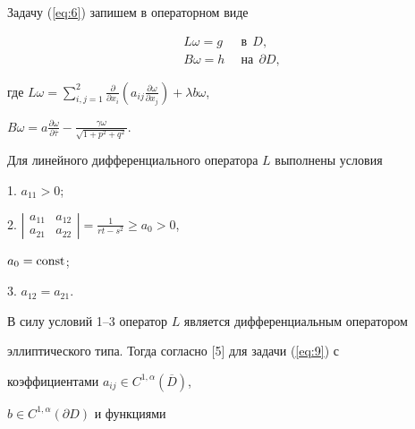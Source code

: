 \begin{pf}


Задачу (\ref{eq:6}) запишем в операторном виде


\begin{equation}


\label{eq:9}


\begin{split}


L\omega=g & \ \; \text{в}\ \ D, \\


B\omega=h & \ \; \text{на}\ \ \partial D,


\end{split}


\end{equation}


где $L\omega=\sum\limits^2_{i,j=1} {\frac{\partial }{\partial x_i }


({a_{ij} \frac{\partial \omega }{\partial x_j }})}+\lambda b\omega$,


$B\omega=a\frac{\partial \omega }{\partial \overline \tau } -


\frac{\gamma \omega }{\sqrt {1+p^2+q^2} }$.





Для линейного дифференциального оператора $L$ выполнены условия





1. $a_{11} > 0$;





2. $\left|\begin{smallmatrix} a_{11} & a_{12} \\ a_{21} & a_{22}


\end{smallmatrix} \right|=\frac{1}{rt - s^2} \ge a_0 > 0$, 


$a_0=\operatorname{const}$;





3. $ a_{12}=a_{21} $.





В силу условий 1--3 оператор $L$ является дифференциальным оператором 


эллиптического типа. Тогда согласно [5] для задачи (\ref{eq:9}) с


коэффициентами $a_{ij} \in C^{1,\alpha } ({\overline D })$,


$b \in C^{1,\alpha } ({\partial D})$ и функциями 



\end{pf}
